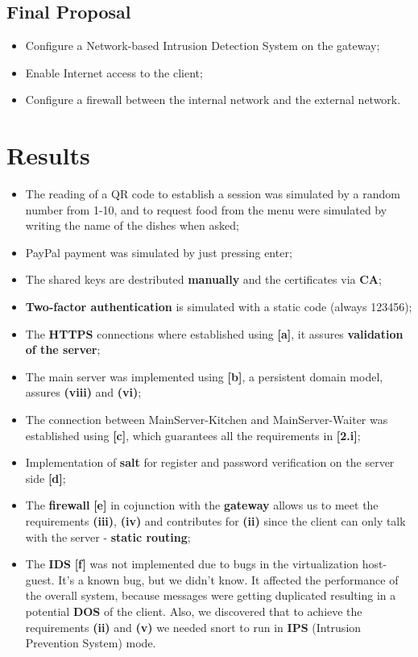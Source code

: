 \documentclass[12pt,paper=a4]{article}
\begin{document}
\subsection{Final Proposal}
\begin{itemize}
\item[\ding{51}] Configure a Network-based Intrusion Detection System on the gateway;
\item[\ding{51}] Enable Internet access to the client;
\item[\ding{51}] Configure a firewall between the internal network and the external network.
\end{itemize}

\section{Results}
\begin{itemize}
\item The reading of a QR code to establish a session was simulated by a random number from 1-10, and to request food from the menu were simulated by writing the name of the dishes when asked;
\item PayPal payment was simulated by just pressing enter;
\item The shared keys are destributed \textbf{manually} and the certificates via \textbf{CA};
\item \textbf{Two-factor authentication} is simulated with a static code (always 123456);
\item The \textbf{HTTPS} connections where established using \textbf{[a]}, it assures \textbf{validation of the server};
\item The main server was implemented using \textbf{[b]}, a persistent domain model, assures \textbf{(viii)} and \textbf{(vi)};
\item The connection between MainServer-Kitchen and MainServer-Waiter was established using \textbf{[c]}, which guarantees all the requirements in \textbf{[2.i]};
\item Implementation of \textbf{salt} for register and password verification on the server side \textbf{[d]};
\item The \textbf{firewall} \textbf{[e]} in cojunction with the \textbf{gateway} allows us to meet the requirements \textbf{(iii)}, \textbf{(iv)} and contributes for \textbf{(ii)} since the client can only talk with the server - \textbf{static routing};
\item The \textbf{IDS} \textbf{[f]} was not implemented due to bugs in the virtualization host-guest. It's a known bug, but we didn't know. It affected the performance of the overall system, because messages were getting duplicated resulting in a potential \textbf{DOS} of the client. Also, we discovered that to achieve the requirements \textbf{(ii)} and \textbf{(v)} we needed snort to run in \textbf{IPS} (Intrusion Prevention System) mode.
\end{itemize}
\end{document}
